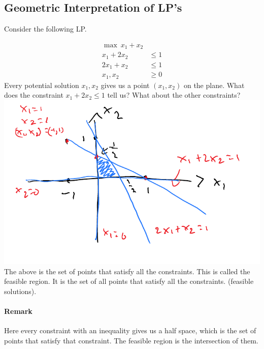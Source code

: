 \documentclass[12 pt]{article}
\begin{document}
        \subsection{Geometric Interpretation of LP's} Consider the following
        LP.

        \begin{align*}
          \max \ x_1+x_2
          \\ x_1 + 2x_2  & \leq 1
          \\ 2x_1 + x_2 & \leq 1
          \\ x_1, x_2 & \geq 0
        \end{align*}
        Every potential solution $x_1, x_2$ gives us a point $(x_1,
        x_2)$ on the plane.
        What does the constraint $x_1 + 2x_2 \leq 1$ tell us? What
        about the other constraints?
        \\ \includegraphics[width=.9\textwidth]{i100.pdf}
        The above is the set of points that satisfy all the
        constraints. This is called the feasible region. It is the set
        of all points that satisfy all the constraints. (feasible
        solutions).
        \paragraph{Remark} Here every constraint with an inequality
        gives us a half space, which is the set of points that satisfy
        that constraint. The feasible region is the intersection of them.
\end{document}
